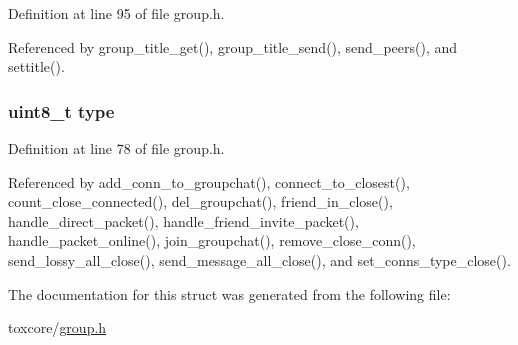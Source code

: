 Definition at line 95 of file group.\+h.



Referenced by group\+\_\+title\+\_\+get(), group\+\_\+title\+\_\+send(), send\+\_\+peers(), and settitle().

\hypertarget{struct_group__c_a1d127017fb298b889f4ba24752d08b8e}{
\subsubsection[{type}]{\setlength{\rightskip}{0pt plus 5cm}uint8\+\_\+t type}}\label{struct_group__c_a1d127017fb298b889f4ba24752d08b8e}


Definition at line 78 of file group.\+h.



Referenced by add\+\_\+conn\+\_\+to\+\_\+groupchat(), connect\+\_\+to\+\_\+closest(), count\+\_\+close\+\_\+connected(), del\+\_\+groupchat(), friend\+\_\+in\+\_\+close(), handle\+\_\+direct\+\_\+packet(), handle\+\_\+friend\+\_\+invite\+\_\+packet(), handle\+\_\+packet\+\_\+online(), join\+\_\+groupchat(), remove\+\_\+close\+\_\+conn(), send\+\_\+lossy\+\_\+all\+\_\+close(), send\+\_\+message\+\_\+all\+\_\+close(), and set\+\_\+conns\+\_\+type\+\_\+close().



The documentation for this struct was generated from the following file\+:\begin{DoxyCompactItemize}
\item 
toxcore/\hyperlink{toxcore_2group_8h}{group.\+h}\end{DoxyCompactItemize}
